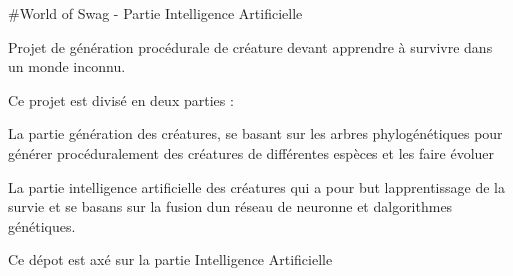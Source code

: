 \#\+World of Swag -\/ Partie Intelligence Artificielle

Projet de génération procédurale de créature devant apprendre à survivre dans un monde inconnu.

Ce projet est divisé en deux parties \+:
\begin{DoxyItemize}
\item La partie génération des créatures, se basant sur les arbres phylogénétiques pour générer procéduralement des créatures de différentes espèces et les faire évoluer
\item La partie intelligence artificielle des créatures qui a pour but l\textquotesingle{}apprentissage de la survie et se basans sur la fusion d\textquotesingle{}un réseau de neuronne et d\textquotesingle{}algorithmes génétiques.
\end{DoxyItemize}

Ce dépot est axé sur la partie Intelligence Artificielle 